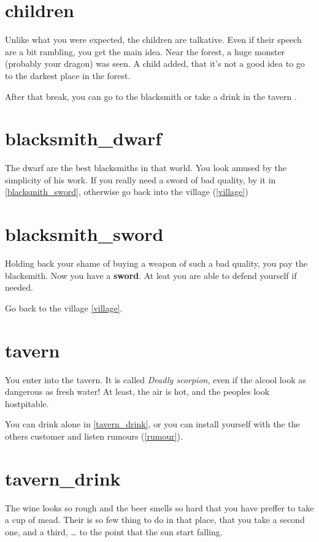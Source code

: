 \section{children}

Unlike what you were expected, the children are talkative. Even if their speech
are a bit rambling, you get the main idea. Near the forest, a huge monster
(probably your dragon) was seen. A child added, that it's not a good idea to go
to the darkest place in the forest.

After that break, you can go to the blacksmith \blacksmith or take a drink in
the tavern \tavern.

\section{blacksmith_dwarf}

The dwarf are the best blacksmiths in that world. You look amused by the
simplicity of his work. If you really need a sword of bad quality, by it in
\ref{blacksmith_sword}, otherwise go back into the village (\ref{village})

\section{blacksmith_sword}

Holding back your shame of buying a weapon of such a bad quality, you pay the
blacksmith. Now you have a \textbf{sword}. At leat you are able to defend
yourself if needed.

Go back to the village \ref{village}.

\section{tavern}

You enter into the tavern. It is called \textit{Deadly scorpion}, even if the
alcool look as dangerous as fresh water! At least, the air is hot, and the
peoples look hostpitable.

You can drink alone in \ref{tavern_drink}, or you can install yourself with the
the others customer and listen rumours (\ref{rumour}).

\section{tavern_drink}

The wine looks so rough and the beer smells so hard that you have preffer to
take a cup of mead. Their is so few thing to do in that place, that you take a
second one, and a third, … to the point that the sun start falling.

